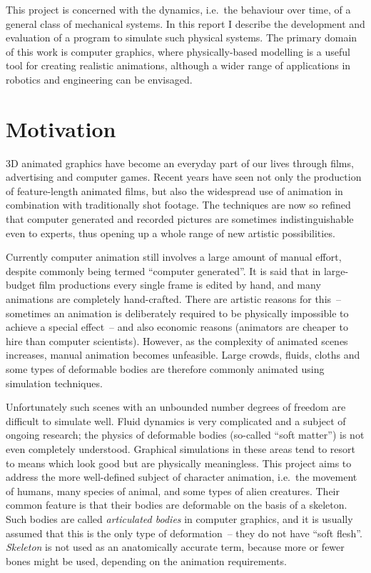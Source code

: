 This project is concerned with the dynamics, i.e.\ the behaviour over time, of a general class
of mechanical systems. In this report I describe the development and evaluation of a program to
simulate such physical systems. The primary domain of this work is computer graphics, where
physically-based modelling is a useful tool for creating realistic animations, although a wider
range of applications in robotics and engineering can be envisaged.

\section{Motivation}

3D animated graphics have become an everyday part of our lives through films, advertising and
computer games. Recent years have seen not only the production of feature-length animated films,
but also the widespread use of animation in combination with traditionally shot footage. The
techniques are now so refined that computer generated and recorded pictures are sometimes
indistinguishable even to experts, thus opening up a whole range of new artistic possibilities.

Currently computer animation still involves a large amount of manual effort, despite commonly
being termed ``computer generated''. It is said that in large-budget film productions every single
frame is edited by hand, and many animations are completely hand-crafted. There are artistic
reasons for this~-- sometimes an animation is deliberately required to be physically impossible
to achieve a special effect~-- and also economic reasons (animators are cheaper to hire than
computer scientists). However, as the complexity of animated scenes increases, manual animation
becomes unfeasible. Large crowds, fluids, cloths and some types of deformable bodies are therefore
commonly animated using simulation techniques.

Unfortunately such scenes with an unbounded number degrees of freedom are difficult to simulate
well. Fluid dynamics is very complicated and a subject of ongoing research; the physics of
deformable bodies (so-called ``soft matter'') is not even completely understood. Graphical
simulations in these areas tend to resort to means which look good but are physically meaningless.
This project aims to address the more well-defined subject of character animation, i.e.\ the
movement of humans, many species of animal, and some types of alien creatures. Their common
feature is that their bodies are deformable on the basis of a skeleton. Such bodies are called
\emph{articulated bodies} in computer graphics, and it is usually assumed that this is the only
type of deformation~-- they do not have ``soft flesh''. \textsl{Skeleton} is not used as an
anatomically accurate term, because more or fewer bones might be used, depending on the animation
requirements.


